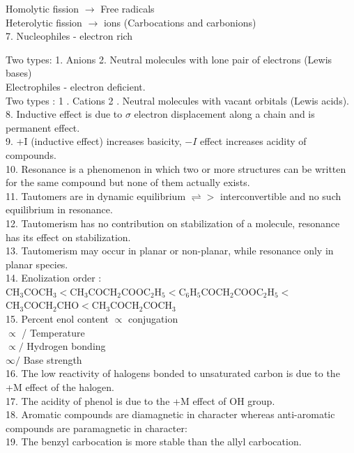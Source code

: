 \documentclass[10pt]{article}
\begin{document}
Homolytic fission $\rightarrow$ Free radicals\\
Heterolytic fission $\rightarrow$ ions (Carbocations and carbonions)\\
7. Nucleophiles - electron rich

Two types: 1. Anions 2. Neutral molecules with lone pair of electrons (Lewis bases)\\
Electrophiles - electron deficient.\\
Two types : 1 . Cations 2 . Neutral molecules with vacant orbitals (Lewis acids).\\
8. Inductive effect is due to $\sigma$ electron displacement along a chain and is permanent effect.\\
9. +I (inductive effect) increases basicity, $-I$ effect increases acidity of compounds.\\
10. Resonance is a phenomenon in which two or more structures can be written for the same compound but none of them actually exists.\\
11. Tautomers are in dynamic equilibrium $\rightleftharpoons>$ interconvertible and no such equilibrium in resonance.\\
12. Tautomerism has no contribution on stabilization of a molecule, resonance has its effect on stabilization.\\
13. Tautomerism may occur in planar or non-planar, while resonance only in planar species.\\
14. Enolization order : $\mathrm{CH}_{3} \mathrm{COCH}_{3}<\mathrm{CH}_{3} \mathrm{COCH}_{2} \mathrm{COOC}_{2} \mathrm{H}_{5}<\mathrm{C}_{6} \mathrm{H}_{5} \mathrm{COCH}_{2} \mathrm{COOC}_{2} \mathrm{H}_{5}<$ $\mathrm{CH}_{3} \mathrm{COCH}_{2} \mathrm{CHO}<\mathrm{CH}_{3} \mathrm{COCH}_{2} \mathrm{COCH}_{3}$\\
15. Percent enol content $\propto$ conjugation\\
$\propto$ / Temperature\\
$\propto /$ Hydrogen bonding\\
$\infty /$ Base strength\\
16. The low reactivity of halogens bonded to unsaturated carbon is due to the +M effect of the halogen.\\
17. The acidity of phenol is due to the +M effect of OH group.\\
18. Aromatic compounds are diamagnetic in character whereas anti-aromatic compounds are paramagnetic in character:\\
19. The benzyl carbocation is more stable than the allyl carbocation.
\end{document}
